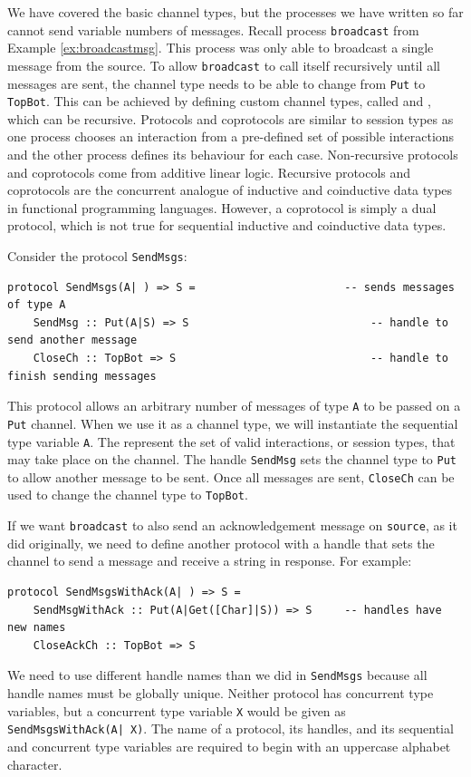 \documentclass[11pt]{article}
\begin{document}
We have covered the basic channel types, but the processes we have written so far cannot send variable numbers of messages.
Recall process \lstinline$broadcast$ from Example \ref{ex:broadcastmsg}.
This process was only able to broadcast a single message from the source.
To allow \lstinline$broadcast$ to call itself recursively until all messages are sent, the channel type needs to be able to change from \lstinline$Put$ to \lstinline$TopBot$.
This can be achieved by defining custom channel types, called  and , which can be recursive.
Protocols and coprotocols are similar to session types as one process chooses an interaction from a pre-defined set of possible interactions and the other process defines its behaviour for each case.
Non-recursive protocols and coprotocols come from additive linear logic.
Recursive protocols and coprotocols are the concurrent analogue of inductive and coinductive data types in functional programming languages. 
However, a coprotocol is simply a dual protocol, which is not true for sequential inductive and coinductive data types.

Consider the protocol \lstinline$SendMsgs$:
\begin{lstlisting}[label=ex:protocolpassmsgs, caption=Protocol for sending an arbitrary number of messages] 
protocol SendMsgs(A| ) => S =						-- sends messages of type A
	SendMsg :: Put(A|S) => S 							-- handle to send another message
	CloseCh :: TopBot => S 								-- handle to finish sending messages
\end{lstlisting}
This protocol allows an arbitrary number of messages of type \lstinline$A$ to be passed on a \lstinline$Put$ channel.
When we use it as a channel type, we will instantiate the sequential type variable \lstinline$A$.
The  represent the set of valid interactions, or session types, that may take place on the channel. 
The handle \lstinline$SendMsg$ sets the channel type to \lstinline$Put$ to allow another message to be sent.
Once all messages are sent, \lstinline$CloseCh$ can be used to change the channel type to \lstinline$TopBot$.

If we want \lstinline$broadcast$ to also send an acknowledgement message on \lstinline$source$, as it did originally, we need to define another protocol with a handle that sets the channel to send a message and receive a string in response. For example:
 \begin{lstlisting}[label=ex:protocolpassmsgswconf, caption=Protocol for sending messages and receiving acknowledgement messages] 
protocol SendMsgsWithAck(A| ) => S =
	SendMsgWithAck :: Put(A|Get([Char]|S)) => S 	-- handles have new names
	CloseAckCh :: TopBot => S 		
\end{lstlisting}
We need to use different handle names than we did in \lstinline$SendMsgs$ because all handle names must be globally unique.
Neither protocol has concurrent type variables, but a concurrent type variable \lstinline$X$ would be given as \lstinline$SendMsgsWithAck(A| X)$.
The name of a protocol, its handles, and its sequential and concurrent type variables are required to begin with an uppercase alphabet character. 
\end{document}
